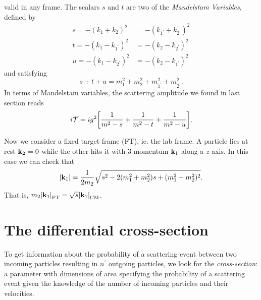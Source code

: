 valid in any frame. The scalars $s$ and $t$ are two of the \textit{Mandelstam Variables}, defined by
\begin{equation}
    \begin{aligned}
        s=-(k_1+k_2)^2&=-(k_{1^\prime}+k_{2^\prime})^2\\
        t=-(k_1-k_{1^\prime})^2&=-(k_2-k_{2^\prime})^2\\
        u=-(k_1-k_{2^\prime})^2&=-(k_2-k_{1^\prime})^2
    \end{aligned}
    \label{mandelstam}
\end{equation}
and satisfying
\begin{equation}
    s+t+u=m_1^2+m_2^2+m_{1^\prime}^2+m_{2^\prime}^2.
    \label{soma_mandelstam}
\end{equation}
In terms of Mandelstam variables, the scattering amplitude we found in last section reads
\begin{equation}
    i\mathcal{T}=ig^2\qty[\frac{1}{m^2-s}+\frac{1}{m^2-t}+\frac{1}{m^2-u}].
\end{equation}

Now we consider a fixed target frame (FT), ie. the lab frame. A particle lies at rest $\vb{k_2}=0$ while the other hits it with 3-momentum $\vb{k}_1$ along a $z$ axis. In this case we can check that
\begin{equation}
    \abs{\vb{k}_1}=\frac{1}{2m_2}\sqrt{s^2-2(m_1^2+m_2^2)s+(m_1^2-m_2^2)^2}.
\end{equation}
That is, $m_2\abs{\vb{k}_1}_{\text{FT}}=\sqrt{s}\abs{\vb{k}_1}_{\text{CM}}$.
\section{The differential cross-section}
To get information about the probability of a scattering event between two incoming particles resulting in $n^\prime$ outgoing particles, we look for the \textit{cross-section}: a parameter with dimensions of area specifying the probability of a scattering event given the knowledge of the number of incoming particles and their velocities. \\

